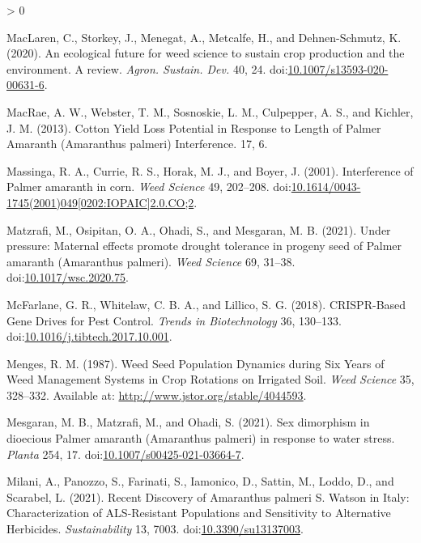 \documentclass[utf8]{frontiersSCNS}
\newlength{\cslhangindent}
\newenvironment{CSLReferences}[2] %
 {%
  \setlength{\parindent}{0pt}
  \ifodd #1 \everypar{\setlength{\hangindent}{\cslhangindent}}\ignorespaces\fi
  \ifnum #2 > 0
  \setlength{\parskip}{#2\baselineskip}
  \fi
 }%
 {}
\begin{document}
\begin{CSLReferences}{1}{0}
\leavevmode\hypertarget{ref-maclaren2020}{}%
MacLaren, C., Storkey, J., Menegat, A., Metcalfe, H., and
Dehnen-Schmutz, K. (2020). An ecological future for weed science to
sustain crop production and the environment. {A} review. \emph{Agron.
Sustain. Dev.} 40, 24.
doi:\href{https://doi.org/10.1007/s13593-020-00631-6}{10.1007/s13593-020-00631-6}.

\leavevmode\hypertarget{ref-macrae2013}{}%
MacRae, A. W., Webster, T. M., Sosnoskie, L. M., Culpepper, A. S., and
Kichler, J. M. (2013). Cotton {Yield Loss Potential} in {Response} to
{Length} of {Palmer Amaranth} ({Amaranthus} palmeri) {Interference}. 17,
6.

\leavevmode\hypertarget{ref-massinga2001}{}%
Massinga, R. A., Currie, R. S., Horak, M. J., and Boyer, J. (2001).
Interference of {Palmer} amaranth in corn. \emph{Weed Science} 49,
202--208.
doi:\href{https://doi.org/10.1614/0043-1745(2001)049\%5B0202:IOPAIC\%5D2.0.CO;2}{10.1614/0043-1745(2001)049{[}0202:IOPAIC{]}2.0.CO;2}.

\leavevmode\hypertarget{ref-matzrafi2021}{}%
Matzrafi, M., Osipitan, O. A., Ohadi, S., and Mesgaran, M. B. (2021).
Under pressure: Maternal effects promote drought tolerance in progeny
seed of {Palmer} amaranth ({Amaranthus} palmeri). \emph{Weed Science}
69, 31--38.
doi:\href{https://doi.org/10.1017/wsc.2020.75}{10.1017/wsc.2020.75}.

\leavevmode\hypertarget{ref-mcfarlane2018}{}%
McFarlane, G. R., Whitelaw, C. B. A., and Lillico, S. G. (2018).
{CRISPR}-{Based Gene Drives} for {Pest Control}. \emph{Trends in
Biotechnology} 36, 130--133.
doi:\href{https://doi.org/10.1016/j.tibtech.2017.10.001}{10.1016/j.tibtech.2017.10.001}.

\leavevmode\hypertarget{ref-menges1987}{}%
Menges, R. M. (1987). Weed {Seed Population Dynamics} during {Six Years}
of {Weed Management Systems} in {Crop Rotations} on {Irrigated Soil}.
\emph{Weed Science} 35, 328--332. Available at:
\url{http://www.jstor.org/stable/4044593}.

\leavevmode\hypertarget{ref-mesgaran2021}{}%
Mesgaran, M. B., Matzrafi, M., and Ohadi, S. (2021). Sex dimorphism in
dioecious {Palmer} amaranth ({Amaranthus} palmeri) in response to water
stress. \emph{Planta} 254, 17.
doi:\href{https://doi.org/10.1007/s00425-021-03664-7}{10.1007/s00425-021-03664-7}.

\leavevmode\hypertarget{ref-milani2021}{}%
Milani, A., Panozzo, S., Farinati, S., Iamonico, D., Sattin, M., Loddo,
D., and Scarabel, L. (2021). Recent {Discovery} of {Amaranthus} palmeri
{S}. {Watson} in {Italy}: {Characterization} of {ALS}-{Resistant
Populations} and {Sensitivity} to {Alternative Herbicides}.
\emph{Sustainability} 13, 7003.
doi:\href{https://doi.org/10.3390/su13137003}{10.3390/su13137003}.


\end{CSLReferences}
\end{document}
